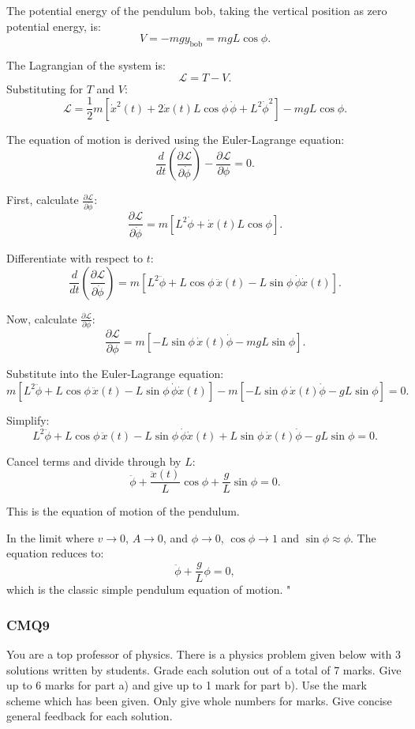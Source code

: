 The potential energy of the pendulum bob, taking the vertical position as zero potential energy, is:
\[
V = -mg y_\text{bob} = mgL\cos\phi.
\]

The Lagrangian of the system is:
\[
\mathcal{L} = T - V.
\]
Substituting for $T$ and $V$:
\[
\mathcal{L} = \frac{1}{2}m\left[\dot{x}^2(t) + 2\dot{x}(t)L\cos\phi \, \dot{\phi} + L^2\dot{\phi}^2\right] - mgL\cos\phi.
\]

The equation of motion is derived using the Euler-Lagrange equation:
\[
\frac{d}{dt}\left(\frac{\partial \mathcal{L}}{\partial \dot{\phi}}\right) - \frac{\partial \mathcal{L}}{\partial \phi} = 0.
\]

First, calculate $\frac{\partial \mathcal{L}}{\partial \dot{\phi}}$:
\[
\frac{\partial \mathcal{L}}{\partial \dot{\phi}} = m\left[L^2\dot{\phi} + \dot{x}(t)L\cos\phi\right].
\]

Differentiate with respect to $t$:
\[
\frac{d}{dt}\left(\frac{\partial \mathcal{L}}{\partial \dot{\phi}}\right) = m\left[L^2\ddot{\phi} + L\cos\phi \, \ddot{x}(t) - L\sin\phi \, \dot{\phi}\dot{x}(t)\right].
\]

Now, calculate $\frac{\partial \mathcal{L}}{\partial \phi}$:
\[
\frac{\partial \mathcal{L}}{\partial \phi} = m\left[-L\sin\phi \, \dot{x}(t)\dot{\phi} - mgL\sin\phi\right].
\]

Substitute into the Euler-Lagrange equation:
\[
m\left[L^2\ddot{\phi} + L\cos\phi \, \ddot{x}(t) - L\sin\phi \, \dot{\phi}\dot{x}(t)\right] - m\left[-L\sin\phi \, \dot{x}(t)\dot{\phi} - gL\sin\phi\right] = 0.
\]

Simplify:
\[
L^2\ddot{\phi} + L\cos\phi \, \ddot{x}(t) - L\sin\phi \, \dot{\phi}\dot{x}(t) + L\sin\phi \, \dot{x}(t)\dot{\phi} - gL\sin\phi = 0.
\]

Cancel terms and divide through by $L$:
\[
\ddot{\phi} + \frac{\ddot{x}(t)}{L}\cos\phi + \frac{g}{L}\sin\phi = 0.
\]

This is the equation of motion of the pendulum.

In the limit where $v \to 0$, $A \to 0$, and $\phi \to 0$, $\cos\phi \to 1$ and $\sin\phi \approx \phi$. The equation reduces to:
\[
\ddot{\phi} + \frac{g}{L}\phi = 0,
\]
which is the classic simple pendulum equation of motion.
"

\subsubsection{CMQ9}

You are a top professor of physics. There is a physics problem given below with 3 solutions written by students. Grade each solution out of a total of 7 marks. Give up to 6 marks for part a) and give up to 1 mark for part b). Use the mark scheme which has been given. Only give whole numbers for marks. Give concise general feedback for each solution.

